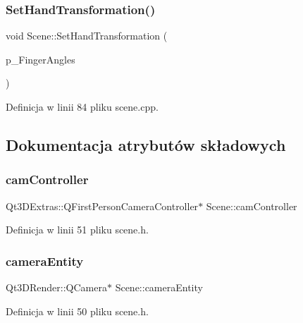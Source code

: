 \mbox{\label{class_scene_ae58cf344ad78420d37acde7984c9a4e8}} 
\subsubsection{\texorpdfstring{Set\+Hand\+Transformation()}{SetHandTransformation()}}
{\footnotesize\ttfamily void Scene\+::\+Set\+Hand\+Transformation (\begin{DoxyParamCaption}\item[{Q\+Vector$<$ Q\+Vector$<$ float $>$$>$}]{p\+\_\+\+Finger\+Angles }\end{DoxyParamCaption})}



Definicja w linii 84 pliku scene.\+cpp.



\subsection{Dokumentacja atrybutów składowych}
\mbox{\label{class_scene_a55d0f4c21e5ac40b4ad53a67bf851ff7}} 
\subsubsection{\texorpdfstring{cam\+Controller}{camController}}
{\footnotesize\ttfamily Qt3\+D\+Extras\+::\+Q\+First\+Person\+Camera\+Controller$\ast$ Scene\+::cam\+Controller}



Definicja w linii 51 pliku scene.\+h.

\mbox{\label{class_scene_aed08c4ba793fa5d32104d47c9cfd2c5c}} 
\subsubsection{\texorpdfstring{camera\+Entity}{cameraEntity}}
{\footnotesize\ttfamily Qt3\+D\+Render\+::\+Q\+Camera$\ast$ Scene\+::camera\+Entity}



Definicja w linii 50 pliku scene.\+h.


